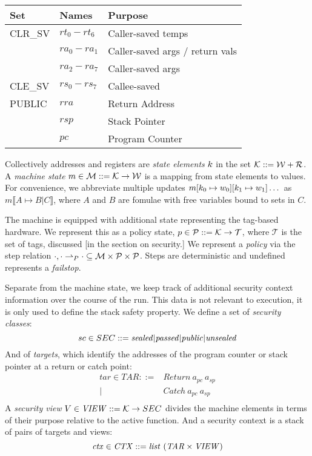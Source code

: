 \documentclass[10pt,conference]{ieeetran}%
\theoremstyle{definition}
\begin{document}
\vspace{\abovedisplayskip}
\begin{tabular}{| l | l | l |}
  \hline
  Set & Names & Purpose \\
  \hline
  CLR\_SV & \(rt_0 - rt_6\) & Caller-saved temps \\
  & \(ra_0 - ra_1\) & Caller-saved args / return vals \\
  & \(ra_2 - ra_7\) & Caller-saved args \\
  \hline
  CLE\_SV & \(rs_0 - rs_7\) & Callee-saved \\
  \hline
  PUBLIC & \(rra\) & Return Address \\
  & \(rsp\) & Stack Pointer \\
  & \(pc\) & Program Counter \\
  \hline
\end{tabular}
\vspace{\abovedisplayskip}

Collectively addresses and registers are {\em state elements} \(k\)
in the set \({\mathcal K} ::= {\mathcal W} + {\mathcal R}\).
%
A {\em machine state} \(m \in {\mathcal M} ::= {\mathcal K} \rightarrow {\mathcal W}\)
is a mapping from state elements to values. For convenience, we abbreviate
multiple updates \(m[k_0 \mapsto w_0][k_1 \mapsto w_1]\dots\)
as \(m \llbracket A \mapsto B | C \rrbracket\), where \(A\) and \(B\)
are fomulae with free variables bound to sets in \(C\).

The machine is equipped with additional state representing the tag-based hardware.
We represent this as a policy state, \(p \in \mathcal{P} ::= {\mathcal K} \rightarrow \mathcal{T}\),
where \(\mathcal{T}\) is the set of tags, discussed [in the section on security.]
We represent a {\it policy} via the step relation
\(\cdot, \cdot \rightharpoonup_P \cdot \subseteq {\mathcal M} \times \mathcal{P} \times \mathcal{P}\).
Steps are deterministic and  undefined represents a {\it failstop}.

Separate from the machine state, we keep track of additional security context
information over the course of the run. This data is not relevant to execution,
it is only used to define the stack safety property. We define a set of
{\it security classes}:
\[sc \in SEC ::= \mathit{sealed} | \mathit{passed} | \mathit{public} | \mathit{unsealed}\]
And of {\it targets}, which identify the addresses of the program counter or
stack pointer at a return or catch point:
\[\begin{split}
tar \in TAR ::= & \mathit{Return} ~ a_{pc} ~ a_{sp} \\
| & \mathit{Catch} ~ a_{pc} ~ a_{sp} \\
\end{split}\]
A {\it security view} \(V \in \mathit{VIEW} ::= {\mathcal K} \rightarrow SEC\) divides the machine
elements in terms of their purpose relative to the active function.
And a security context is a stack of pairs of targets and views:
\[\mathit{ctx} \in \mathit{CTX} ::= \mathit{list} ~ (\mathit{TAR} \times \mathit{VIEW})\]
\end{document}
